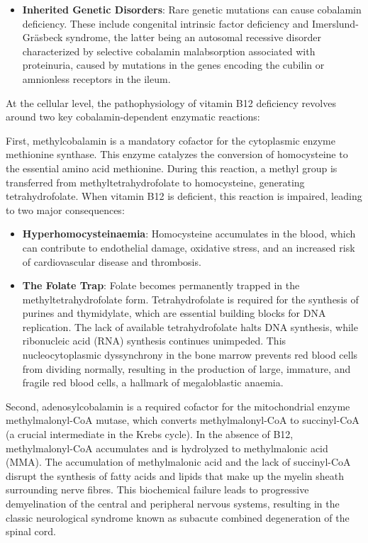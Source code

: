 \begin{itemize}
    \item \textbf{Inherited Genetic Disorders}: Rare genetic mutations can cause cobalamin deficiency. These include congenital intrinsic factor deficiency and Imerslund-Gr\"{a}sbeck syndrome, the latter being an autosomal recessive disorder characterized by selective cobalamin malabsorption associated with proteinuria, caused by mutations in the genes encoding the cubilin or amnionless receptors in the ileum.
\end{itemize}

At the cellular level, the pathophysiology of vitamin B12 deficiency revolves around two key cobalamin-dependent enzymatic reactions:

First, methylcobalamin is a mandatory cofactor for the cytoplasmic enzyme methionine synthase. This enzyme catalyzes the conversion of homocysteine to the essential amino acid methionine. During this reaction, a methyl group is transferred from methyltetrahydrofolate to homocysteine, generating tetrahydrofolate. When vitamin B12 is deficient, this reaction is impaired, leading to two major consequences:
\begin{itemize}
    \item \textbf{Hyperhomocysteinaemia}: Homocysteine accumulates in the blood, which can contribute to endothelial damage, oxidative stress, and an increased risk of cardiovascular disease and thrombosis.
    \item \textbf{The Folate Trap}: Folate becomes permanently trapped in the methyltetrahydrofolate form. Tetrahydrofolate is required for the synthesis of purines and thymidylate, which are essential building blocks for DNA replication. The lack of available tetrahydrofolate halts DNA synthesis, while ribonucleic acid (RNA) synthesis continues unimpeded. This nucleocytoplasmic dyssynchrony in the bone marrow prevents red blood cells from dividing normally, resulting in the production of large, immature, and fragile red blood cells, a hallmark of megaloblastic anaemia.
\end{itemize}

Second, adenosylcobalamin is a required cofactor for the mitochondrial enzyme methylmalonyl-CoA mutase, which converts methylmalonyl-CoA to succinyl-CoA (a crucial intermediate in the Krebs cycle). In the absence of B12, methylmalonyl-CoA accumulates and is hydrolyzed to methylmalonic acid (MMA). The accumulation of methylmalonic acid and the lack of succinyl-CoA disrupt the synthesis of fatty acids and lipids that make up the myelin sheath surrounding nerve fibres. This biochemical failure leads to progressive demyelination of the central and peripheral nervous systems, resulting in the classic neurological syndrome known as subacute combined degeneration of the spinal cord.

